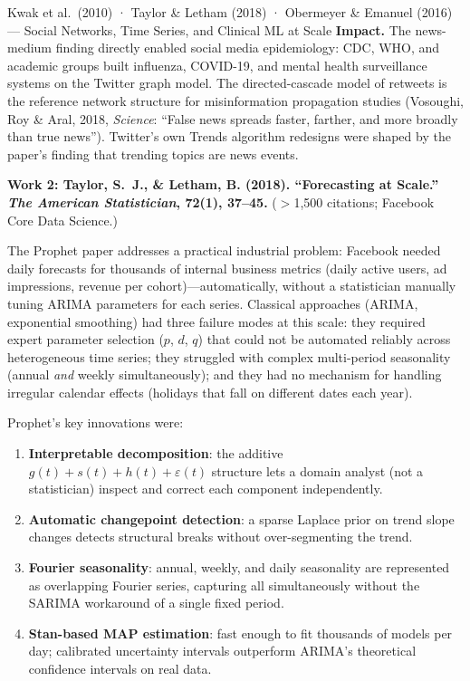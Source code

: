 \begin{researchspotlight}{Kwak et al.\ (2010) · Taylor \& Letham (2018)
  · Obermeyer \& Emanuel (2016) --- Social Networks, Time Series, and
  Clinical ML at Scale}
\textbf{Impact.} The news-medium finding directly enabled social media
epidemiology: CDC, WHO, and academic groups built influenza, COVID-19,
and mental health surveillance systems on the Twitter graph model.
The directed-cascade model of retweets is the reference network structure
for misinformation propagation studies (Vosoughi, Roy \& Aral, 2018,
\textit{Science}: ``False news spreads faster, farther, and more broadly
than true news''). Twitter's own Trends algorithm redesigns were shaped
by the paper's finding that trending topics are news events.

\medskip
\textbf{Work 2: Taylor, S.~J., \& Letham, B. (2018). ``Forecasting at
Scale.'' \textit{The American Statistician}, 72(1), 37--45.}
($>$1{,}500 citations; Facebook Core Data Science.)

The Prophet paper addresses a practical industrial problem: Facebook
needed daily forecasts for thousands of internal business metrics
(daily active users, ad impressions, revenue per cohort)---automatically,
without a statistician manually tuning ARIMA parameters for each series.
Classical approaches (ARIMA, exponential smoothing) had three failure modes
at this scale: they required expert parameter selection ($p$, $d$, $q$)
that could not be automated reliably across heterogeneous time series;
they struggled with complex multi-period seasonality (annual \emph{and}
weekly simultaneously); and they had no mechanism for handling irregular
calendar effects (holidays that fall on different dates each year).

Prophet's key innovations were:
\begin{enumerate}
  \item \textbf{Interpretable decomposition}: the additive
        $g(t) + s(t) + h(t) + \varepsilon(t)$ structure lets a domain
        analyst (not a statistician) inspect and correct each component
        independently.
  \item \textbf{Automatic changepoint detection}: a sparse Laplace prior
        on trend slope changes detects structural breaks without
        over-segmenting the trend.
  \item \textbf{Fourier seasonality}: annual, weekly, and daily seasonality
        are represented as overlapping Fourier series, capturing all
        simultaneously without the SARIMA workaround of a single fixed period.
  \item \textbf{Stan-based MAP estimation}: fast enough to fit thousands
        of models per day; calibrated uncertainty intervals outperform
        ARIMA's theoretical confidence intervals on real data.
\end{enumerate}


\end{researchspotlight}
